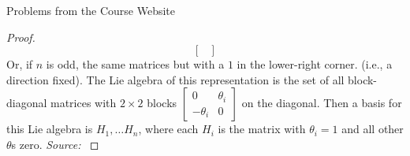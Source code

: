 \documentclass[12pt]{article}
\theoremstyle{definition}
\newenvironment{problem}[2][Problem]{\begin{trivlist}
\item[\hskip \labelsep {\bfseries #1}\hskip \labelsep {\bfseries #2.}]}{\end{trivlist}}
\begin{document}
\begin{section}{Problems from the Course Website}
\begin{problem}{2}
\begin{proof}
\[\begin{bmatrix}
	\end{bmatrix}\]
	Or, if $n$ is odd, the same matrices but with a $1$ in the lower-right corner. (i.e., a direction fixed). The Lie algebra of this representation is the set of all block-diagonal matrices with $2\times 2$ blocks $\begin{bmatrix}
		0 & \theta_i \\ -\theta_i & 0
	\end{bmatrix}$ on the diagonal. Then a basis for this Lie algebra is $H_1, \dots H_n$, where each $H_i$ is the matrix with $\theta_i = 1$ and all other $\theta$s zero.
	\textit{Source: }\cite{tapp}
		\end{proof}
	\end{problem}
\end{section}
\begin{thebibliography}{}
\end{thebibliography}
\end{document}
